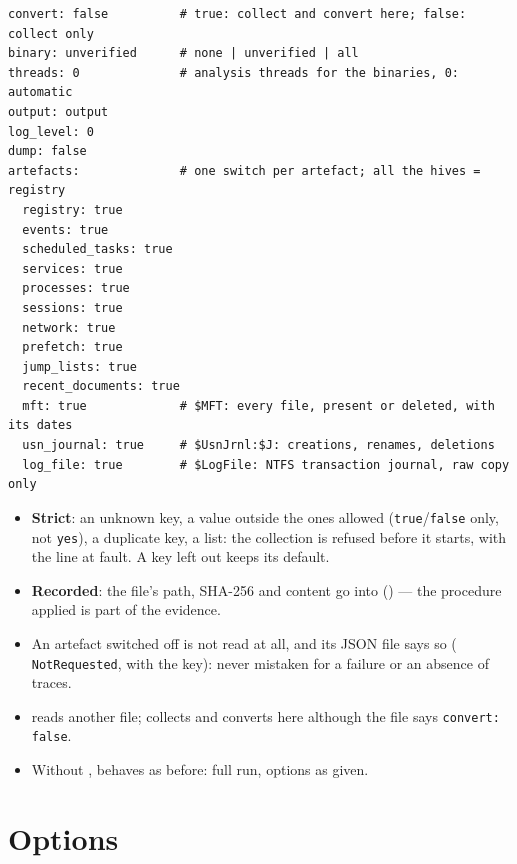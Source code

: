 \documentclass[11pt,a4paper,oneside]{report}
\begin{document}
\begin{lstlisting}
convert: false          # true: collect and convert here; false: collect only
binary: unverified      # none | unverified | all
threads: 0              # analysis threads for the binaries, 0: automatic
output: output
log_level: 0
dump: false
artefacts:              # one switch per artefact; all the hives = registry
  registry: true
  events: true
  scheduled_tasks: true
  services: true
  processes: true
  sessions: true
  network: true
  prefetch: true
  jump_lists: true
  recent_documents: true
  mft: true             # $MFT: every file, present or deleted, with its dates
  usn_journal: true     # $UsnJrnl:$J: creations, renames, deletions
  log_file: true        # $LogFile: NTFS transaction journal, raw copy only
\end{lstlisting}

\begin{itemize}
  \item \textbf{Strict}: an unknown key, a value outside the ones allowed
    (\texttt{true}/\texttt{false} only, not \texttt{yes}), a duplicate key, a
    list: the collection is refused before it starts, with the line at fault.
    A key left out keeps its default.
  \item \textbf{Recorded}: the file's path, SHA-256 and content go into
     () — the procedure
    applied is part of the evidence.
  \item An artefact switched off is not read at all, and its JSON file says so
    ( \texttt{NotRequested}, with the key): never
    mistaken for a failure or an absence of traces.
  \item {} reads another file;  collects and converts
    here although the file says \texttt{convert: false}.
  \item Without , \wac{} behaves as before: full run, options
    as given.
\end{itemize}

\section{Options}
\end{document}
